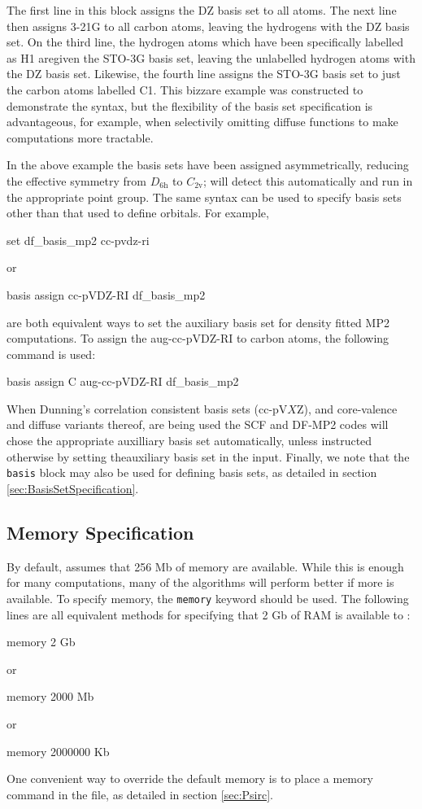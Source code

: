 The first line in this block assigns the DZ basis set to all atoms.  The next
line then assigns 3-21G to all carbon atoms, leaving the hydrogens with the DZ
basis set.  On the third line, the hydrogen atoms which have been specifically
labelled as H1 aregiven the STO-3G basis set, leaving the unlabelled hydrogen
atoms with the DZ basis set.  Likewise, the fourth line assigns the STO-3G
basis set to just the carbon atoms labelled C1.  This bizzare example was
constructed to demonstrate the syntax, but the flexibility of the basis set
specification is advantageous, for example, when selectivily omitting diffuse
functions to make computations more tractable.

In the above example the basis sets have been assigned asymmetrically, reducing
the effective symmetry from $D_{\textrm{6h}}$ to $C_{\textrm{2v}}$; \PSIfour
will detect this automatically and run in the appropriate point group.  The
same syntax can be used to specify basis sets other than that used to define
orbitals.  For example, 

\begin{Snippet}
set df_basis_mp2 cc-pvdz-ri

 or

basis {
   assign cc-pVDZ-RI df_basis_mp2
}
\end{Snippet}
are both equivalent ways to set the auxiliary basis set for density fitted MP2
computations.  To assign the aug-cc-pVDZ-RI to carbon atoms, the following
command is used:
\begin{Snippet}
basis {
   assign C aug-cc-pVDZ-RI df_basis_mp2
}
\end{Snippet}

When Dunning's correlation consistent basis sets (cc-pV$X$Z), and core-valence
and diffuse variants thereof, are being used the SCF and DF-MP2 codes will
chose the appropriate auxilliary basis set automatically, unless instructed
otherwise by setting theauxiliary basis set in the input.  Finally, we note
that the {\tt basis} block may also be used for defining basis sets, as
detailed in section \ref{sec:BasisSetSpecification}.

\subsection{Memory Specification}
By default, \PSIfour assumes that 256 Mb of memory are available. While this is
enough for many computations, many of the algorithms will perform better if
more is available. To specify memory, the {\tt memory} keyword should be used. The following
lines are all equivalent methods for specifying that 2 Gb of RAM is available
to \PSIfour:
\begin{Snippet}
memory 2 Gb

 or

memory 2000 Mb

 or

memory 2000000 Kb
\end{Snippet}
One convenient way to override the \PSIfour default memory is to place a memory
command in the \psirc file, as detailed in section \ref{sec:Psirc}.

